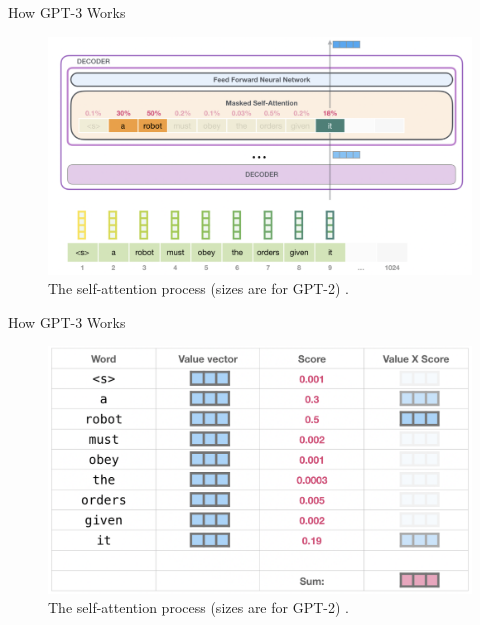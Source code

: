 \documentclass{beamer}
\begin{document}
\begin{frame}{How GPT-3 Works}
    \begin{figure}
        \centering
        \includegraphics[scale=0.35]{gpt3_self_attention1}
        \caption{The self-attention process (sizes are for GPT-2) \cite{alammar2019}.}
        \label{fig:gpt3_self_attention1}
    \end{figure}
\end{frame}

\begin{frame}{How GPT-3 Works}
    \begin{figure}
        \centering
        \includegraphics[scale=0.3]{gpt3_self_attention2}
        \caption{The self-attention process (sizes are for GPT-2) \cite{alammar2019}.}
        \label{fig:gpt3_self_attention2}
    \end{figure}
\end{frame}
\end{document}

